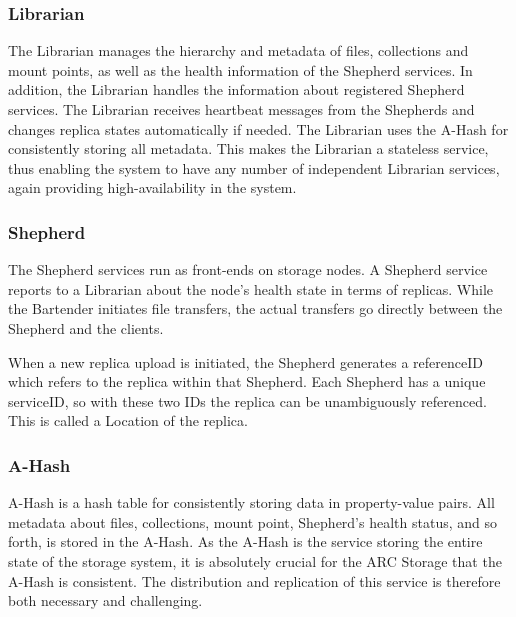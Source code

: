 \documentclass[final]{ieee}
\begin{document}
\subsubsection{Librarian}
\label{librarian}
The Librarian manages the hierarchy and metadata of
files, collections and mount points, as well as the health information of the Shepherd
services. In addition, the Librarian handles
the information about registered Shepherd services. The Librarian receives
heartbeat messages from the Shepherds and changes replica states automatically
if needed. The Librarian uses the A-Hash for consistently storing all metadata. This makes the
Librarian a stateless service, thus enabling the system to have any
number of independent
Librarian services, again providing high-availability in the
system.

\subsubsection{Shepherd}
\label{Shepherd}

The Shepherd services run as front-ends on storage nodes. A Shepherd
service reports to a Librarian about the 
node's health state in terms of replicas. While the Bartender initiates
file transfers, the actual transfers go directly between the Shepherd
and the clients.
 
When a new replica upload
is initiated, the Shepherd generates a referenceID which refers to
the replica within
that Shepherd. Each Shepherd has a unique serviceID, so with these two
IDs the replica can be unambiguously referenced. This is called a Location
of the replica. %



\subsubsection{A-Hash}
\label{Hash Algorithm}

A-Hash is a hash table for consistently storing data in property-value
pairs. All metadata about files, collections, mount point, Shepherd's
health status, and so forth, is stored in the A-Hash. As the A-Hash is
the service storing the entire state of the storage system, it is
absolutely crucial for the ARC Storage that the A-Hash is
consistent. The distribution and replication of this service is
therefore both necessary and challenging.
\end{document}
